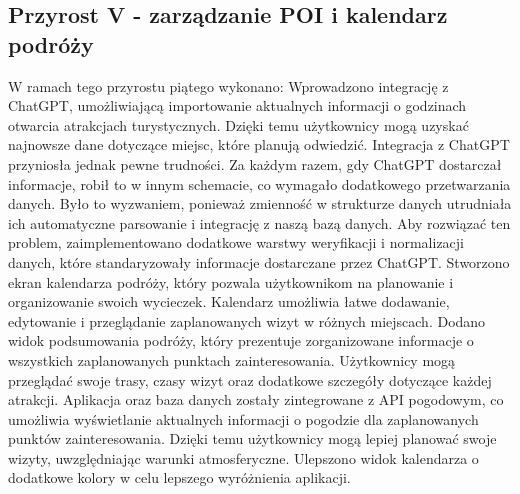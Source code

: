     \subsection{Przyrost V - zarządzanie POI i kalendarz podróży}
    \label{sec:przyrost5}

    W ramach tego przyrostu piątego wykonano:
    Wprowadzono integrację z ChatGPT, umożliwiającą importowanie aktualnych informacji o godzinach otwarcia atrakcjach turystycznych. 
    Dzięki temu użytkownicy mogą uzyskać najnowsze dane dotyczące miejsc, które planują odwiedzić.\newline
    \indent Integracja z ChatGPT przyniosła jednak pewne trudności. Za każdym razem, gdy ChatGPT dostarczał informacje, robił to w innym schemacie, 
    co wymagało dodatkowego przetwarzania danych. Było to wyzwaniem, ponieważ zmienność w strukturze danych utrudniała ich automatyczne parsowanie i integrację z naszą bazą danych. \newline 
    \indent Aby rozwiązać ten problem, zaimplementowano dodatkowe warstwy weryfikacji i normalizacji danych, które standaryzowały informacje dostarczane przez ChatGPT.\newline
    \indent Stworzono ekran kalendarza podróży, który pozwala użytkownikom na planowanie i organizowanie swoich wycieczek.
    Kalendarz umożliwia łatwe dodawanie, edytowanie i przeglądanie zaplanowanych wizyt w różnych miejscach.
    \indent Dodano widok podsumowania podróży, który prezentuje zorganizowane informacje o wszystkich zaplanowanych punktach zainteresowania. 
    Użytkownicy mogą przeglądać swoje trasy, czasy wizyt oraz dodatkowe szczegóły dotyczące każdej atrakcji. \newline
    \indent Aplikacja oraz baza danych zostały zintegrowane z API pogodowym, co umożliwia wyświetlanie aktualnych informacji o pogodzie dla zaplanowanych punktów zainteresowania. 
    Dzięki temu użytkownicy mogą lepiej planować swoje wizyty, uwzględniając warunki atmosferyczne. \newline
    Ulepszono widok kalendarza o dodatkowe kolory w celu lepszego wyróżnienia aplikacji. 



